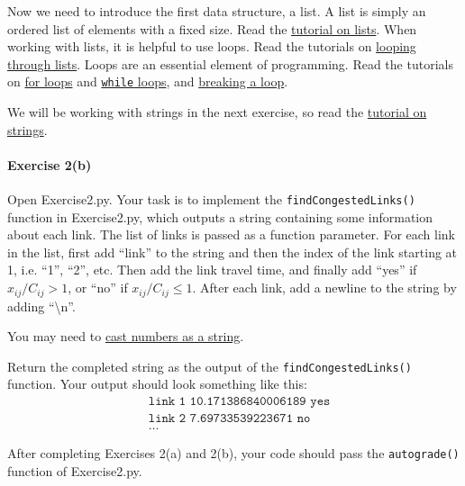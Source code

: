 \documentclass[11pt]{article}
\begin{document}
Now we need to introduce the first data structure, a list. A list is simply an ordered list of elements with a fixed size. Read the \href{https://www.w3schools.com/python/python_lists.asp}{tutorial on lists}. When working with lists, it is helpful to use loops. Read the tutorials on \href{https://www.w3schools.com/python/python_lists_loop.asp}{looping through lists}.
Loops are an essential element of programming. Read the tutorials on \href{https://www.w3schools.com/python/python_for_loops.asp}{for loops} and \href{https://www.w3schools.com/python/python_while_loops.asp}{\texttt{while} loops}, and \href{https://www.w3schools.com/python/ref_keyword_break.asp}{breaking a loop}.

We will be working with strings in the next exercise, so read the \href{https://www.w3schools.com/python/python_strings.asp}{tutorial on strings}.

\paragraph*{Exercise 2(b)} Open Exercise2.py. Your task is to implement the \texttt{findCongestedLinks()} function in Exercise2.py, which outputs a string containing some information about each link.  The list of links is passed as a function parameter. For each link in the list, first add ``link'' to the string and then the index of the link starting at 1, i.e. ``1'', ``2'', etc. Then add the link travel time, and finally add ``yes'' if $x_{ij}/C_{ij} >1$, or ``no'' if $x_{ij}/C_{ij} \leq 1$. After each link, add a newline to the string by adding ``\textbackslash n''. 


You may need to \href{https://www.w3schools.com/python/python_casting.asp}{cast numbers as a string}.


Return the completed string as the output of the \texttt{findCongestedLinks()} function.
	Your output should look something like this:
	\begin{align*}
		& \texttt{link 1 10.171386840006189 yes} \\
		&\texttt{link 2 7.69733539223671 no} \\
		& \ldots
	\end{align*}
	
	 \vspace{\baselineskip}
	
	\noindent
After completing Exercises 2(a) and 2(b), your code should pass the \texttt{autograde()} function of Exercise2.py. 
	
	
	
\end{document}
